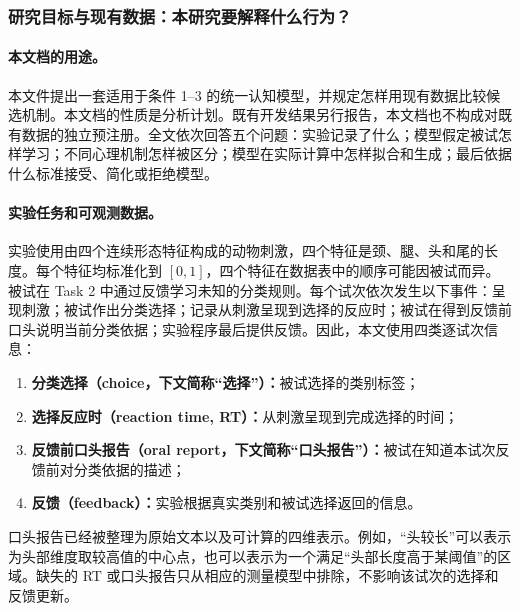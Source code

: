 
\subsubsection{研究目标与现有数据：本研究要解释什么行为？}

\paragraph{本文档的用途。}
本文件提出一套适用于条件 1--3 的统一认知模型，并规定怎样用现有数据比较候选机制。本文档的性质是分析计划。既有开发结果另行报告，本文档也不构成对既有数据的独立预注册。全文依次回答五个问题：实验记录了什么；模型假定被试怎样学习；不同心理机制怎样被区分；模型在实际计算中怎样拟合和生成；最后依据什么标准接受、简化或拒绝模型。

\paragraph{实验任务和可观测数据。}
实验使用由四个连续形态特征构成的动物刺激，四个特征是颈、腿、头和尾的长度。每个特征均标准化到 $[0,1]$，四个特征在数据表中的顺序可能因被试而异。被试在 Task 2 中通过反馈学习未知的分类规则。每个试次依次发生以下事件：呈现刺激；被试作出分类选择；记录从刺激呈现到选择的反应时；被试在得到反馈前口头说明当前分类依据；实验程序最后提供反馈。因此，本文使用四类逐试次信息：
\begin{enumerate}
    \item \textbf{分类选择（choice，下文简称“选择”）：}被试选择的类别标签；
    \item \textbf{选择反应时（reaction time, RT）：}从刺激呈现到完成选择的时间；
    \item \textbf{反馈前口头报告（oral report，下文简称“口头报告”）：}被试在知道本试次反馈前对分类依据的描述；
    \item \textbf{反馈（feedback）：}实验根据真实类别和被试选择返回的信息。
\end{enumerate}
口头报告已经被整理为原始文本以及可计算的四维表示。例如，“头较长”可以表示为头部维度取较高值的中心点，也可以表示为一个满足“头部长度高于某阈值”的区域。缺失的 RT 或口头报告只从相应的测量模型中排除，不影响该试次的选择和反馈更新。

